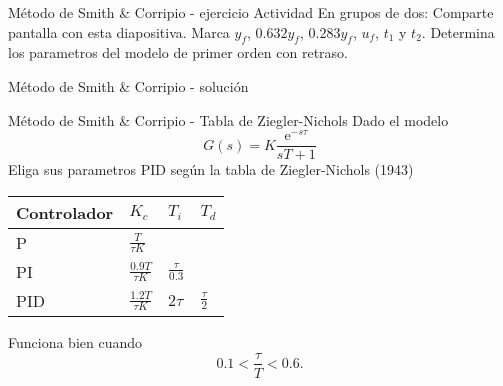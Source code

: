 \documentclass[presentation,aspectratio=1610]{beamer}
\begin{document}
\begin{frame}[label={sec:orgdae0a8b}]{Método de Smith \& Corripio - ejercicio}
\alert{Actividad} En grupos de dos: Comparte pantalla con esta diapositiva. Marca \(y_f\), \(0.632y_f\), \(0.283y_f\), \(u_f\), \(t_1\) y \(t_2\). Determina los parametros del modelo de primer orden con retraso.

\def\uampl{0.5}
\def\ttdelay{0.3}
\def\TTcnst{1.6}
\def\ggain{3}

\pgfmathsetmacro{\yfinal}{\uampl*\ggain}
\pgfmathsetmacro{\two}{\tdelay + \Tcnst}


\begin{center}
\end{center}
\end{frame}

\begin{frame}[label={sec:org96005ad}]{Método de Smith \& Corripio - solución}
\end{frame}
\begin{frame}[label={sec:org2d3d798}]{Método de Smith \& Corripio - Tabla de Ziegler-Nichols}
Dado el modelo 
\[ G(s) = K \frac{\mathrm{e}^{-s\tau}}{sT + 1} \]
Eliga sus parametros PID según la tabla de Ziegler-Nichols (1943)
   \begin{center}
   \setlength{\tabcolsep}{20pt}
   \renewcommand{\arraystretch}{1.5}
   \begin{tabular}{llll}
   Controlador & \(K_c\) & \(T_i\) & \(T_d\)\\
  \hline\hline
  P & \(\frac{T}{\tau K}\) &  & \\
  PI & \(\frac{0.9T}{\tau K}\) & \(\frac{\tau}{0.3}\) & \\
  PID & \(\frac{1.2T}{\tau K}\) & \(2\tau\) & \(\frac{\tau}{2}\)\\
  \hline
\end{tabular}
\end{center}

Funciona bien cuando \[0.1 < \frac{\tau}{T} < 0.6.\]
\end{frame}
\end{document}
